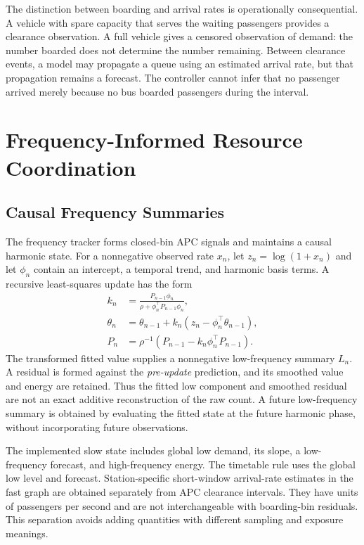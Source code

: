 The distinction between boarding and arrival rates is operationally consequential. A vehicle with spare capacity that serves the waiting passengers provides a clearance observation. A full vehicle gives a censored observation of demand: the number boarded does not determine the number remaining. Between clearance events, a model may propagate a queue using an estimated arrival rate, but that propagation remains a forecast. The controller cannot infer that no passenger arrived merely because no bus boarded passengers during the interval.

\section{Frequency-Informed Resource Coordination}
\label{sec:method}

\subsection{Causal Frequency Summaries}
The frequency tracker forms closed-bin APC signals and maintains a causal harmonic state. For a nonnegative observed rate $x_n$, let $z_n=\log(1+x_n)$ and let $\phi_n$ contain an intercept, a temporal trend, and harmonic basis terms. A recursive least-squares update has the form
\begin{align}
 k_n&=\frac{P_{n-1}\phi_n}{\rho+\phi_n^\top P_{n-1}\phi_n},\\
 \theta_n&=\theta_{n-1}+k_n(z_n-\phi_n^\top\theta_{n-1}),\\
 P_n&=\rho^{-1}(P_{n-1}-k_n\phi_n^\top P_{n-1}).
\end{align}
The transformed fitted value supplies a nonnegative low-frequency summary $L_n$. A residual is formed against the \emph{pre-update} prediction, and its smoothed value and energy are retained. Thus the fitted low component and smoothed residual are not an exact additive reconstruction of the raw count. A future low-frequency summary is obtained by evaluating the fitted state at the future harmonic phase, without incorporating future observations.

The implemented slow state includes global low demand, its slope, a low-frequency forecast, and high-frequency energy. The timetable rule uses the global low level and forecast. Station-specific short-window arrival-rate estimates in the fast graph are obtained separately from APC clearance intervals. They have units of passengers per second and are not interchangeable with boarding-bin residuals. This separation avoids adding quantities with different sampling and exposure meanings.

